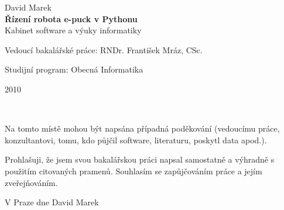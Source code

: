 \documentclass[12pt,notitlepage]{report}
\begin{document}
\begin{titlepage}
\begin{center}
\vspace{15mm}

{\Large David Marek}\\ %
\vspace{5mm}
{\Large\bf Řízení robota e-puck v Pythonu}\\ %
\vspace{5mm}
Kabinet software a výuky informatiky\\ %
\end{center}
\vspace{15mm}

\large
\noindent Vedoucí bakalářské práce: RNDr. František Mráz, CSc. %
\vspace{1mm}

\noindent Studijní program: Obecná Informatika

\vspace{20mm}

\begin{center}
2010 %
\end{center}

\end{titlepage} %

\normalsize %
\setcounter{page}{2} %
\ \vspace{10mm}

\noindent Na tomto místě mohou být napsána případná poděkování (vedoucímu práce, konzultantovi, tomu, kdo půjčil software, literaturu, poskytl data apod.). %

\vspace{\fill} %
\noindent Prohlašuji, že jsem svou bakalářskou práci napsal samostatně a výhradně s použitím citovaných pramenů. Souhlasím se zapůjčováním práce a jejím zveřejňováním.

\bigskip
\noindent V Praze dne \hspace{\fill}David Marek\\ %
\end{document}
